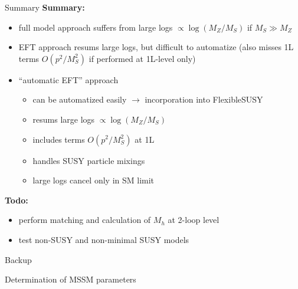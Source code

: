 \documentclass[hyperref={pdfpagelabels=false},ngerman]{beamer}
\renewcommand{\emph}{\textbf}
\begin{document}
\begin{frame}{Summary}
  \emph{Summary:}
  \begin{itemize}
  \item full model approach suffers from large logs
    $\propto\log(M_Z/M_S)$ if $M_S \gg M_Z$
  \item EFT approach resums large logs, but difficult to automatize
    (also misses 1L terms $O(p^2/M_S^2)$ if performed at 1L-level
    only)
  \item ``automatic EFT'' approach
    \begin{itemize}
    \item can be automatized easily $\rightarrow$ incorporation into
      FlexibleSUSY
    \item resums large logs $\propto\log(M_Z/M_S)$
    \item includes terms $O(p^2/M_S^2)$ at 1L
    \item handles SUSY particle mixings
    \item large logs cancel only in SM limit
    \end{itemize}
  \end{itemize}
  \emph{Todo:}
  \begin{itemize}
  \item perform matching and calculation of $M_h$ at 2-loop level
  \item test non-SUSY and non-minimal SUSY models
  \end{itemize}
\end{frame}


\begin{frame}[noframenumbering]
  \begin{center}
    \Huge Backup
  \end{center}
\end{frame}


\begin{frame}[noframenumbering]
  \begin{center}
    \Large Determination of MSSM parameters
  \end{center}
\end{frame}

\end{document}
